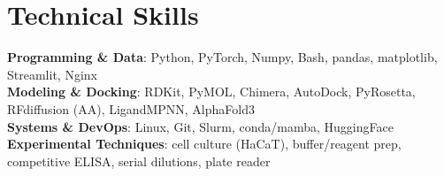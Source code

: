 \documentclass[letterpaper,11pt]{article}
\begin{document}
\section{Technical Skills}
\begin{itemize}[leftmargin=0.15in, label={}]
\small{\item{
\textbf{Programming \& Data}: Python, PyTorch, Numpy, Bash, pandas, matplotlib, Streamlit, Nginx \\
\textbf{Modeling \& Docking}: RDKit, PyMOL, Chimera, AutoDock, PyRosetta, RFdiffusion (AA), LigandMPNN, AlphaFold3 \\
\textbf{Systems \& DevOps}: Linux, Git, Slurm, conda/mamba, HuggingFace \\
\textbf{Experimental Techniques}: cell culture (HaCaT), buffer/reagent prep, competitive ELISA, serial dilutions, plate reader

}}
\end{itemize}
\end{document}
